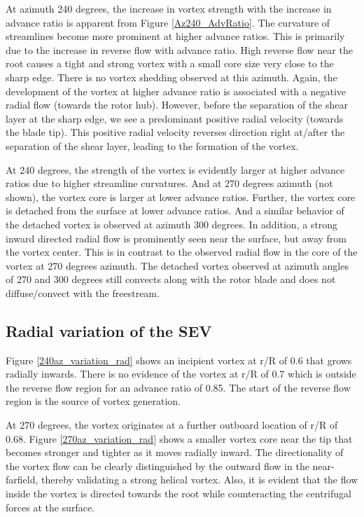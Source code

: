 \documentclass[%
 reprint,
 showkeys,
 amsmath,amssymb,
 aps,
]{revtex4-1}
\begin{document}
At azimuth 240 degrees, the increase in vortex strength with the increase in advance ratio is apparent from Figure \ref{Az240_AdvRatio}. The curvature of streamlines become more prominent at higher advance ratios. This is primarily due
to the increase in reverse flow with advance ratio. High reverse flow near the root causes a tight and strong vortex with a small core size very close to the sharp edge. There is no vortex shedding observed at this azimuth. Again, the development of the vortex at higher advance ratio is associated with a negative radial flow (towards the rotor hub). However, before the separation of the shear layer at the sharp edge, we see a predominant positive radial velocity (towards the blade tip). This positive radial velocity reverses direction right at/after the separation of the shear layer, leading to the formation of the vortex.

At 240 degrees, the strength of the vortex is evidently larger at higher advance ratios due to higher streamline curvatures. And at 270 degrees azimuth (not shown), the vortex core is larger at lower advance ratios. Further, the vortex core is detached from the surface at lower advance ratios. And a similar behavior of the detached vortex is observed at azimuth 300 degrees. In addition, a strong inward directed radial flow is prominently seen near the surface, but away from the vortex center. This is in contrast to the observed radial flow in the core of the vortex at 270 degrees azimuth. The detached vortex observed at azimuth angles of 270 and 300 degrees still convects along with the rotor blade and does not diffuse/convect with the freestream.




\subsection{Radial variation of the SEV}
Figure \ref{240az_variation_rad} shows an incipient vortex at r/R of 0.6 that grows radially inwards. There is no evidence of the vortex at r/R of 0.7 which is outside the reverse flow region for an advance ratio of 0.85. The start of the reverse flow region is the source of vortex generation. 

At 270 degrees, the vortex originates at a further outboard location of r/R of 0.68. Figure \ref{270az_variation_rad} shows a smaller vortex core near the tip that becomes stronger and tighter as it moves radially inward. The directionality of the vortex flow can be clearly distinguished by the outward flow in the near-farfield, thereby validating a strong helical vortex. Also, it is evident that the flow inside the vortex is directed towards the root while counteracting the centrifugal forces at the surface.    
\end{document}
